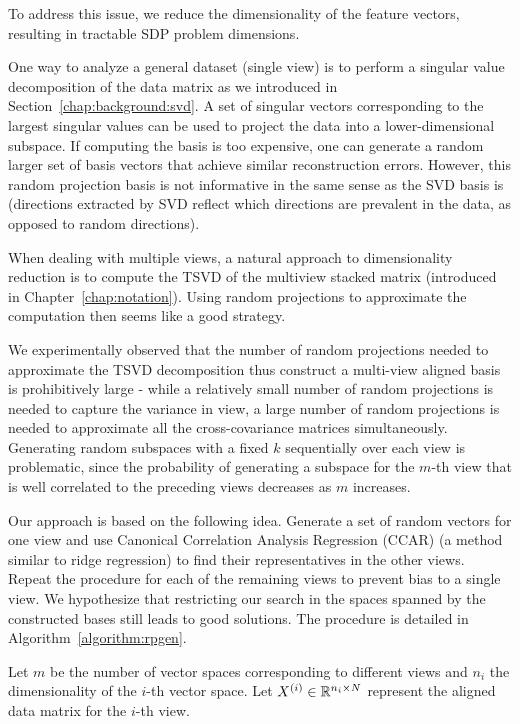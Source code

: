 To address this issue, we reduce the dimensionality of the feature vectors, resulting in
tractable SDP problem dimensions.

One way to analyze a general dataset (single view) is to
perform a singular value decomposition of the data matrix as
we introduced in Section~\ref{chap:background:svd}.
A set of singular vectors corresponding to the largest singular
values can be used to project the data into a lower-dimensional
subspace. If computing the basis is too expensive, one can generate a random
larger set of basis vectors that achieve similar reconstruction
errors. However, this random projection basis is not
informative in the same sense as the SVD basis is
(directions extracted by SVD reflect which directions are
prevalent in the data, as opposed to random directions).

When dealing with multiple views, a natural approach to
dimensionality reduction is to compute the TSVD of the multiview stacked matrix (introduced in Chapter~\ref{chap:notation}).
Using random projections to approximate the computation then seems like
a good strategy.

We experimentally observed that the number of random projections needed to approximate
the TSVD decomposition thus construct a multi-view aligned basis is prohibitively large -
while a relatively small number of random projections is needed to capture the variance in view, a large
number of random projections is needed to approximate all the cross-covariance matrices simultaneously.
Generating random subspaces with a fixed $k$ sequentially over each view is problematic, since
the probability of generating a subspace for the $m$-th view that is well correlated to the preceding
views decreases as $m$ increases.

Our approach is based on the following idea. Generate a set of random vectors for one view and use
Canonical Correlation Analysis Regression (CCAR)\cite{ccar} (a method similar to ridge regression)
to find their representatives in the other views. Repeat the procedure for each of the remaining views
to prevent bias to a single view. We hypothesize that restricting our search in the spaces spanned
by the constructed bases still leads to good solutions. The procedure is detailed in Algorithm~\ref{algorithm:rpgen}.

Let $m$ be the number of vector spaces corresponding to different
views and $n_i$ the dimensionality of the $i$-th vector
space. Let $X^{(i)} \in \mathbb{R}^{n_i \times N}$ represent the aligned
data matrix for the $i$-th view.


